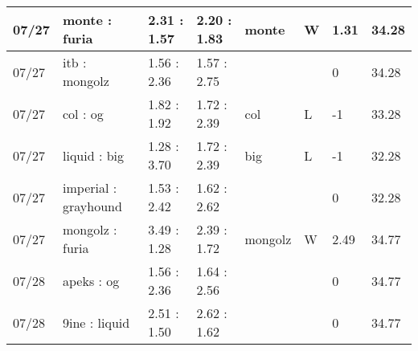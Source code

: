 \begin{small}
\begin{longtable}{|l|l|l|l|l|l|l|l|}
	07/27                               & monte : furia                       & 2.31 : 1.57                             & 2.20 : 1.83                             & monte                             & W                                 & 1.31                                 & 34.28                             \\ \hline
	07/27                               & itb : mongolz                       & 1.56 : 2.36                             & 1.57 : 2.75                             &                                   &                                   & 0                                    & 34.28                             \\ \hline
	07/27                               & col : og                            & 1.82 : 1.92                             & 1.72 : 2.39                             & col                               & L                                 & -1                                   & 33.28                             \\ \hline
	07/27                               & liquid : big                        & 1.28 : 3.70                             & 1.72 : 2.39                             & big                               & L                                 & -1                                   & 32.28                             \\ \hline
	07/27                               & imperial : grayhound                & 1.53 : 2.42                             & 1.62 : 2.62                             &                                   &                                   & 0                                    & 32.28                             \\ \hline
	07/27                               & mongolz : furia                     & 3.49 : 1.28                             & 2.39 : 1.72                             & mongolz                           & W                                 & 2.49                                 & 34.77                             \\ \hline
	07/28                               & apeks : og                          & 1.56 : 2.36                             & 1.64 : 2.56                             &                                   &                                   & 0                                    & 34.77                             \\ \hline
	07/28                               & 9ine : liquid                       & 2.51 : 1.50                             & 2.62 : 1.62                             &                                   &                                   & 0                                    & 34.77                             \\ \hline

\end{longtable}
\end{small}
